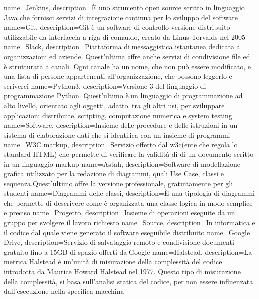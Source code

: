  {
	name=Jenkins,
	description={È uno strumento open source scritto in linguaggio Java che fornisci servizi di integrazione continua per lo sviluppo del software}
}
 {
	name=Git,
	description={Git è un software di controllo versione distribuito utilizzabile da interfaccia a riga di comando, creato da Linus Torvalds nel 2005}
}
 {
	name=Slack,
	description={Piattaforma di messaggistica istantanea dedicata a organizzazioni ed aziende. Quest'ultima offre anche servizi di condivisione file ed è strutturata a canali. Ogni canale ha un nome, che non può essere modificato, e una lista di persone appartenenti all'organizzazione, che possono leggerlo e scriverci}
}
 {
	name=Python3,
	description={Versione 3 del linguaggio di programmazione Python. Quest'ultimo è un linguaggio di programmazione ad alto livello, orientato agli oggetti, adatto, tra gli altri usi, per sviluppare applicazioni distribuite, scripting, computazione numerica e system testing}
}
 {
	name=Software,
	description={Insieme delle procedure e delle istruzioni in un sistema di elaborazione dati che si identifica con un insieme di programmi}
}
 {
	name=W3C markup,
	description={Servizio offerto dal w3c(ente che regola lo standard HTML) che permette di verificare la validità di di un documento scritto in un linguaggio markup}
}
 {
	name=Astah,
	description={Software di modellazione grafica utilizzato per la redazione di diagrammi, quali Use Case, classi e sequenza.Quest'ultimo offre la versione professionale, gratuitamente per gli studenti}
}
 {
	name=Diagrammi delle classi,
	description={È una tipologia di diagrammi che permette di descrivere come è organizzata una classe logica in modo semplice e preciso}
}
 {
	name=Progetto,
	description={Insieme di operazioni eseguite da un gruppo per svolgere il lavoro richiesto}
}
 {
	name=Source,
	description={In informatica e il codice dal quale viene generato il software eseguibile distribuito}
}
 {
	name=Google Drive,
	description={Servizio di salvataggio remoto e condivisione documenti gratuito fino a 15GB di spazio offerti da Google}
}
 {
	name=Halstead,
	description={La metrica Halstead è un'unità di misurazione della complessità del codice introdotta da Maurice Howard Halstead nel 1977. Questo tipo di misurazione della complessità, si basa sull'analisi statica del codice, per non essere influenzata dall'esecuzione nella specifica macchina}
}
